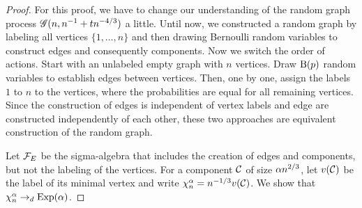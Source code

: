 \begin{proof}
	For this proof,
	we have to change our understanding of the random graph process $\mathscr{G}(n, n^{-1} + tn^{-4/3})$ a little.
	Until now, we constructed a random graph by labeling all vertices $\{1, \dots, n\}$ 
	and then drawing Bernoulli random variables to construct edges and consequently components.
	Now we switch the order of actions. 
	Start with an unlabeled empty graph with $n$ vertices.
	Draw $\operatorname*{B}(p)$ random variables to establish edges between vertices.
	Then, one by one, assign the labels $1$ to $n$ to the vertices,
	where the probabilities are equal for all remaining vertices.
	Since the construction of edges is independent of vertex labels and edge are constructed independently of each other,
	these two approaches are equivalent construction of the random graph.
	
	Let $\mathcal{F}_E$ be the sigma-algebra that includes the creation of edges and components, 
	but not the labeling of the vertices.
	For a component $\mathcal{C}$ of size $\alpha n^{2 / 3}$,
	let $v(\mathcal{C})$ be the label of its minimal vertex and write 
	$\chi^\alpha_n = n^{-1 / 3}v(\mathcal{C})$.
	We show that $\chi^\alpha_n \rightarrow_d \operatorname*{Exp}(\alpha)$.
	

\end{proof}
